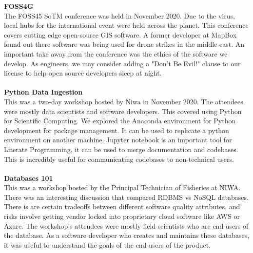 \documentclass[9pt]{developercv}
\begin{document}
{{%
{
	{\textbf{FOSS4G}}
	\\
	The FOSS45 SoTM conference was held in November 2020. Due to the virus, local hubs for the international event were held across the planet. This conference covers cutting edge open-source GIS software. A former developer at MapBox found out there software was being used for drone strikes in the middle east. An important take away from the conference was the ethics of the software we develop. As engineers, we may consider adding a "Don't Be Evil!" clause to our license to help open source developers sleep at night.
	\\\\
}
{
	{\textbf{Python Data Ingestion}}
	\\
	This was a two-day workshop hosted by Niwa in November 2020. The attendees were mostly data scientists and software developers. This covered using Python for Scientific Computing. We explored the Anaconda environment for Python development for package management. It can be used to replicate a python environment on another machine. Jupyter notebook is an important tool for Literate Programming, it can be used to merge documentation and codebases. This is incredibly useful for communicating codebases to non-technical users.
	\\\\
}
{
	{\textbf{Databases 101}}
	\\
	This was a workshop hosted by the Principal Technician of Fisheries at NIWA. There was an interesting discussion that compared RDBMS vs NoSQL databases. There is are certain tradeoffs between different software quality attributes, and risks involve getting vendor locked into proprietary cloud software like AWS or Azure. The workshop's attendees were mostly field scientists who are end-users of the database. As a software developer who creates and maintains these databases, it was useful to understand the goals of the end-users of the product.
}



}}
\end{document}
